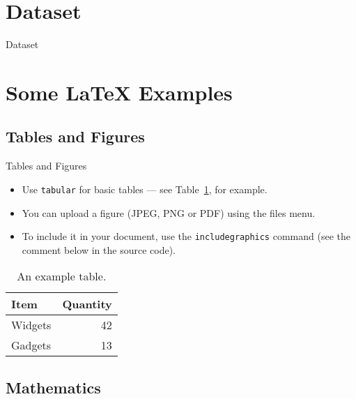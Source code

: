 \documentclass{beamer}
\begin{document}
    \section{Dataset}
    \begin{frame}{Dataset}
        
    \end{frame}

    \section{Some \LaTeX{} Examples}
    
    \subsection{Tables and Figures}
    
    \begin{frame}{Tables and Figures}
    
    \begin{itemize}
    \item Use \texttt{tabular} for basic tables --- see Table~\ref{tab:widgets}, for example.
    \item You can upload a figure (JPEG, PNG or PDF) using the files menu. 
    \item To include it in your document, use the \texttt{includegraphics} command (see the comment below in the source code).
    \end{itemize}
    
    
    \begin{table}
    \centering
    \begin{tabular}{l|r}
    Item & Quantity \\\hline
    Widgets & 42 \\
    Gadgets & 13
    \end{tabular}
    \caption{\label{tab:widgets}An example table.}
    \end{table}
    
    \end{frame}
    
    \subsection{Mathematics}
    
\end{document}
